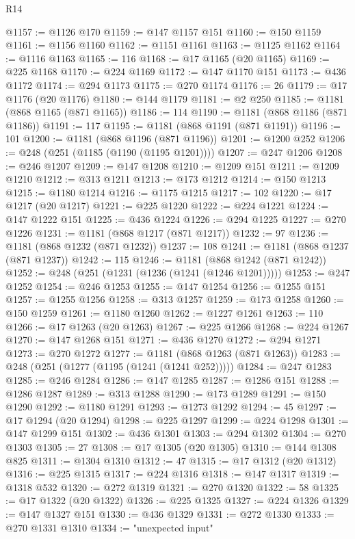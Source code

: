 \begin{lexlean}{R14}
\begin{coremodule}
@1157 := @1126 @170
@1159 := @147 @1157 @151
@1160 := @150 @1159
@1161 := @1156 @1160
@1162 := @1151 @1161
@1163 := @1125 @1162
@1164 := @1116 @1163
@1165 := 116
@1168 := @17 @1165 (@20 @1165)
@1169 := @225 @1168
@1170 := @224 @1169
@1172 := @147 @1170 @151
@1173 := @436 @1172
@1174 := @294 @1173
@1175 := @270 @1174
@1176 := 26
@1179 := @17 @1176 (@20 @1176)
@1180 := @144 @1179
@1181 := @2 @250
@1185 := @1181 (@868 @1165 (@871 @1165))
@1186 := 114
@1190 := @1181 (@868 @1186 (@871 @1186))
@1191 := 117
@1195 := @1181 (@868 @1191 (@871 @1191))
@1196 := 101
@1200 := @1181 (@868 @1196 (@871 @1196))
@1201 := @1200 @252
@1206 := @248 (@251 (@1185 (@1190 (@1195 @1201))))
@1207 := @247 @1206
@1208 := @246 @1207
@1209 := @147 @1208
@1210 := @1209 @151
@1211 := @1209 @1210
@1212 := @313 @1211
@1213 := @173 @1212
@1214 := @150 @1213
@1215 := @1180 @1214
@1216 := @1175 @1215
@1217 := 102
@1220 := @17 @1217 (@20 @1217)
@1221 := @225 @1220
@1222 := @224 @1221
@1224 := @147 @1222 @151
@1225 := @436 @1224
@1226 := @294 @1225
@1227 := @270 @1226
@1231 := @1181 (@868 @1217 (@871 @1217))
@1232 := 97
@1236 := @1181 (@868 @1232 (@871 @1232))
@1237 := 108
@1241 := @1181 (@868 @1237 (@871 @1237))
@1242 := 115
@1246 := @1181 (@868 @1242 (@871 @1242))
@1252 := @248 (@251 (@1231 (@1236 (@1241 (@1246 @1201)))))
@1253 := @247 @1252
@1254 := @246 @1253
@1255 := @147 @1254
@1256 := @1255 @151
@1257 := @1255 @1256
@1258 := @313 @1257
@1259 := @173 @1258
@1260 := @150 @1259
@1261 := @1180 @1260
@1262 := @1227 @1261
@1263 := 110
@1266 := @17 @1263 (@20 @1263)
@1267 := @225 @1266
@1268 := @224 @1267
@1270 := @147 @1268 @151
@1271 := @436 @1270
@1272 := @294 @1271
@1273 := @270 @1272
@1277 := @1181 (@868 @1263 (@871 @1263))
@1283 := @248 (@251 (@1277 (@1195 (@1241 (@1241 @252)))))
@1284 := @247 @1283
@1285 := @246 @1284
@1286 := @147 @1285
@1287 := @1286 @151
@1288 := @1286 @1287
@1289 := @313 @1288
@1290 := @173 @1289
@1291 := @150 @1290
@1292 := @1180 @1291
@1293 := @1273 @1292
@1294 := 45
@1297 := @17 @1294 (@20 @1294)
@1298 := @225 @1297
@1299 := @224 @1298
@1301 := @147 @1299 @151
@1302 := @436 @1301
@1303 := @294 @1302
@1304 := @270 @1303
@1305 := 27
@1308 := @17 @1305 (@20 @1305)
@1310 := @144 @1308 @825
@1311 := @1304 @1310
@1312 := 47
@1315 := @17 @1312 (@20 @1312)
@1316 := @225 @1315
@1317 := @224 @1316
@1318 := @147 @1317
@1319 := @1318 @532
@1320 := @272 @1319
@1321 := @270 @1320
@1322 := 58
@1325 := @17 @1322 (@20 @1322)
@1326 := @225 @1325
@1327 := @224 @1326
@1329 := @147 @1327 @151
@1330 := @436 @1329
@1331 := @272 @1330
@1333 := @270 @1331 @1310
@1334 := "unexpected input"

\end{coremodule}
\end{lexlean}
